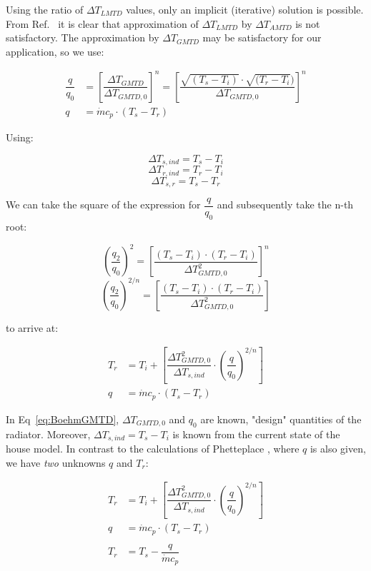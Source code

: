 Using the ratio of $\Delta T_{LMTD}$ values, only an implicit (iterative) solution is possible. From Ref.~\cite{} it is clear that approximation of $\Delta T_{LMTD}$ by $\Delta T_{AMTD}$ is not satisfactory. The approximation by $\Delta T_{GMTD}$ may be satisfactory for our application, so we use:

\begin{equation}
	\begin{aligned}
		\dfrac{q}{q_0} &= \left[\dfrac{\Delta T_{GMTD}}{\Delta T_{GMTD,0}}\right]^{n} = \left[\dfrac{\sqrt{(T_s - T_{i})} \cdot  \sqrt{(T_r - T_{i}})}{\Delta T_{GMTD,0}}\right]^{n} \\
		q &= \dot{m} c_p \cdot (T_s - T_r)
	\end{aligned}
	\label{eq:BoehmGMTD}
\end{equation}

Using:

$$ \Delta T_{s,ind} = T_s - T_i $$
$$ \Delta T_{r,ind} = T_r - T_i $$
$$ \Delta T_{s,r} = T_s - T_r $$

We can take the square of the expression for $\dfrac{q}{q_0}$  and subsequently take the n-th root: 

$$ \left(\dfrac{q_2}{q_0}\right)^2 = \left[\dfrac{(T_s - T_{i}) \cdot  (T_r - T_{i})}{\Delta T_{GMTD,0}^2}\right]^{n} $$
$$ \left(\dfrac{q_2}{q_0}\right)^{2/n} = \left[\dfrac{(T_s - T_{i}) \cdot  (T_r - T_{i})}{\Delta T_{GMTD,0}^2}\right] $$

to arrive at:

\begin{equation}
	\begin{aligned}
		T_{r} &= T_i + \left[\dfrac{\Delta T_{GMTD,0}^2}{\Delta T_{s,ind}} \cdot \left(\dfrac{q}{q_0}\right)^{2/n}\right] \\
		q &= \dot{m} c_p \cdot (T_s - T_r)
	\end{aligned}
	\label{eq:BoehmGMTD}
\end{equation}


In Eq~\ref{eq:BoehmGMTD}, $\Delta T_{GMTD,0}$ and $q_0$ are known, "design" quantities of the radiator. Moreover, $ \Delta T_{s,ind} = T_s - T_i $ is known from the current state of the house model. In contrast to the calculations of Phetteplace \cite{}, where $q$ is also given, we have \emph{two} unknowns $q$ and $T_r$:

\begin{equation}
	\begin{aligned}
		T_{r} &= T_i + \left[\dfrac{\Delta T_{GMTD,0}^2}{\Delta T_{s,ind}} \cdot \left(\dfrac{q}{q_0}\right)^{2/n}\right] \\
		q &= \dot{m} c_p \cdot (T_s - T_r) \\
		\\
		T_{r} &= T_s -\dfrac{q}{\dot{m} c_p}
	\end{aligned}
	\label{eq:PPGMTD}
\end{equation}

